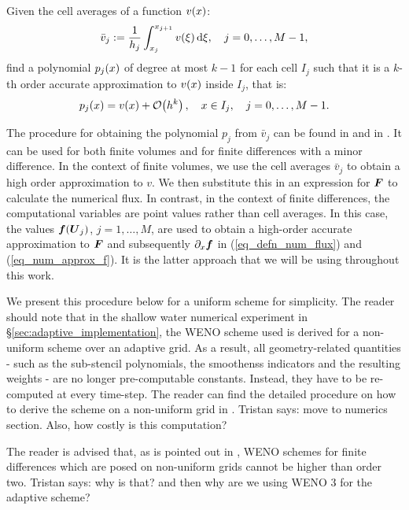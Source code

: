 \documentclass[final]{amsart}
\renewcommand{\vec}[1]{\geovec{#1}}
\newcommand{\tristan}[1]{{\color{purple} Tristan says:  #1 }}
\numberwithin{equation}{section}
\begin{document}
\begin{Defn}
  Given the cell averages of a function $v\!\left({x}\right)$:
  \begin{equation}
    \bar{v}_j:= \frac{1}{h_j}\int_{x_j}^{x_{j+1}} v\!\left({\xi}\right)\mathrm{d}\xi, \quad j=0,\dots,M-1,
  \end{equation}
  find a polynomial $p_j\!\left({x}\right)$ of degree at most $k-1$ for each
  cell $I_j$ such that it is a $k$-th order accurate
  approximation to $v\!\left({x}\right)$ inside $I_j$, that is:
  \begin{equation}
    p_j\!\left({x}\right) = v\!\left({x}\right) + \mathcal{O}\!\left({h^k}\right), \quad x\in I_j, \quad j=0,\dots,M-1.
  \end{equation}
\end{Defn}
The procedure for obtaining the polynomial $p_j$ from $\bar{v}_j$ can
be found in \cite[Procedure 2.2]{shu1998essentially} and in \cite[\S
  2.2]{shu2020essentially}.  It can be used for both finite volumes
and for finite differences with a minor difference.  In the context of
finite volumes, we use the cell averages $\bar{v}_j$ to obtain a high
order approximation to $v$.  We then substitute this in an expression
for $\vec{F}$ to calculate the numerical flux. In contrast, in the
context of finite differences, the computational variables are point
values rather than cell averages. In this case, the values
$\vec{f}\qp{\vec{U}_j}$, $j=1,\dots,M$, are used to obtain a
high-order accurate approximation to $\vec{F}$ and subsequently
$\partial_x\vec{f}$ in (\ref{eq_defn_num_flux}) and
(\ref{eq_num_approx_f}).  It is the latter approach that we will be
using throughout this work.

We present this procedure below for a uniform scheme for simplicity.
The reader should note that in the shallow water numerical experiment
in \S\ref{sec:adaptive_implementation}, the WENO scheme used is
derived for a non-uniform scheme over an adaptive grid.  As a result,
all geometry-related quantities - such as the sub-stencil polynomials,
the smoothenss indicators and the resulting weights - are no longer
pre-computable constants.  Instead, they have to be re-computed at
every time-step.  The reader can find the detailed procedure on how to
derive the scheme on a non-uniform grid in \cite{shu1998essentially}.
\tristan{move to numerics section. Also, how costly is this computation?}

\begin{Rem}
  The reader is advised that, as is pointed out in
  \cite{shu1998essentially}, WENO schemes for finite differences which
  are posed on non-uniform grids cannot be higher than order
  two. \tristan{why is that? and then why are we using WENO 3 for the
    adaptive scheme?}
\end{Rem}
\end{document}
